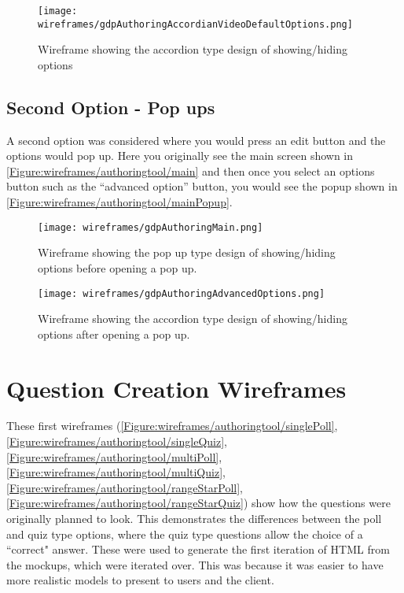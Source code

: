 \begin{figure}
	\texttt{[image: wireframes/gdpAuthoringAccordianVideoDefaultOptions.png]}
	\caption{Wireframe showing the accordion type design of showing/hiding options}
	\label{Figure:wireframes/authoringtool/accordion}
\end{figure}

\subsection{Second Option - Pop ups}

A second option was considered where you would press an edit button and the options would pop up. Here you originally see the main screen shown in \autoref{Figure:wireframes/authoringtool/main} and then once you select an options button such as the ``advanced option'' button, you would see the popup shown in \autoref{Figure:wireframes/authoringtool/mainPopup}.

\begin{landscape}

\begin{figure}
	\texttt{[image: wireframes/gdpAuthoringMain.png]}
	\caption{Wireframe showing the pop up type design of showing/hiding options before opening a pop up.}
	\label{Figure:wireframes/authoringtool/main}
\end{figure}

\begin{figure}
	\texttt{[image: wireframes/gdpAuthoringAdvancedOptions.png]}
	\caption{Wireframe showing the accordion type design of showing/hiding options after opening a pop up.}
	\label{Figure:wireframes/authoringtool/mainPopup}
\end{figure}
\end{landscape}


\section{Question Creation Wireframes}

These first wireframes (\autoref{Figure:wireframes/authoringtool/singlePoll}, \autoref{Figure:wireframes/authoringtool/singleQuiz}, \autoref{Figure:wireframes/authoringtool/multiPoll}, \autoref{Figure:wireframes/authoringtool/multiQuiz}, \autoref{Figure:wireframes/authoringtool/rangeStarPoll}, \autoref{Figure:wireframes/authoringtool/rangeStarQuiz}) show how the questions were originally planned to look. This demonstrates the differences between the poll and quiz type options, where the quiz type questions allow the choice of a ``correct" answer. These were used to generate the first iteration of HTML from the mockups, which were iterated over. This was because it was easier to have more realistic models to present to users and the client.

